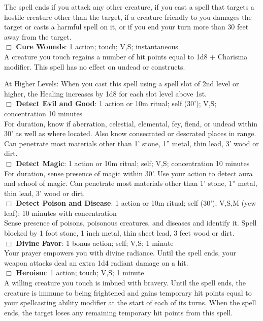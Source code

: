 \documentclass[11pt]{article}
\newcommand{\spell}[1]{{\sc\bfseries #1}}
\begin{document}
{The spell ends if you attack any other creature, if you cast a spell that targets a hostile creature other than the target, if a creature friendly to you damages the target or casts a harmful spell on it, or if you end your turn more than 30 feet away from the target.
\\[4pt]
$\Box$ \spell{Cure Wounds}: 1 action; touch; V,S; instantaneous
\\
A creature you touch regains a number of hit points equal to 1d8 +
Charisma modifier.  This spell has no effect on undead or constructs.

At Higher Levels: When you cast this spell using a spell slot of 2nd
level or higher, the Healing increases by 1d8 for each slot level
above 1st.
\\[4pt]
$\Box$ \spell{Detect Evil and Good}: 1 action or 10m ritual; self (30'); V,S; concentration 10 minutes
\\
For duration, know if aberration, celestial, elemental, fey, fiend, or undead within 30' as well as where located.  Also know consecrated or descrated places in range. Can penetrate most materials other than 1' stone, 1'' metal, thin lead, 3' wood or dirt.
\\[4pt]
$\Box$ \spell{Detect Magic}: 1 action or 10m ritual; self; V,S; concentration 10 minutes
\\
For duration, sense presence of magic within 30'.  Use your action to detect aura and school of magic.  Can penetrate most materials other than 1' stone, 1'' metal, thin lead, 3' wood or dirt.
\\[4pt]
$\Box$ \spell{Detect Poison and Disease}: 1 action or 10m ritual; self (30'); V,S,M (yew leaf); 10 minutes with concentration
\\
Sense presence of poisons, poisonous creatures, and diseases and identify it.  Spell blocked by 1 foot stone, 1 inch metal, thin sheet lead, 3 feet wood or dirt.
\\[4pt]
$\Box$ \spell{Divine Favor}: 1 bonus action; self; V,S; 1 minute
\\
Your prayer empowers you with divine radiance. Until the spell ends, your weapon attacks deal an extra 1d4 radiant damage on a hit.
\\[4pt]
$\Box$ \spell{Heroism}: 1 action; touch; V,S; 1 minute
\\
A willing creature you touch is imbued with bravery. Until the spell
ends, the creature is immune to being frightened and gains temporary
hit points equal to your spellcasting ability modifier at the start of
each of its turns. When the spell ends, the target loses any remaining
temporary hit points from this spell.

}
\end{document}
